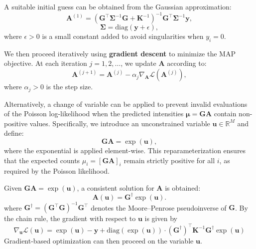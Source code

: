 \documentclass[12pt]{article}
\begin{document}
A suitable initial guess can be obtained from the Gaussian approximation:
\begin{equation}
    \mathbf{A}^{(1)} = \left( \mathbf{G}^\top \boldsymbol{\Sigma}^{-1} \mathbf{G} + \mathbf{K}^{-1} \right)^{-1} \mathbf{G}^\top \boldsymbol{\Sigma}^{-1} \mathbf{y},
\end{equation}
\begin{equation}
    \boldsymbol{\Sigma} = \mathrm{diag}(\mathbf{y} + \epsilon),
\end{equation}
where \( \epsilon > 0 \) is a small constant added to avoid singularities when \( y_i = 0 \).

We then proceed iteratively using \textbf{gradient descent} to minimize the MAP objective.
At each iteration \( j = 1, 2, \ldots \), we update \( \mathbf{A} \) according to:
\begin{equation}
    \mathbf{A}^{(j+1)} = \mathbf{A}^{(j)} - \alpha_j \nabla_{\mathbf{A}} \mathcal{L}(\mathbf{A}^{(j)}),
\end{equation}
where \( \alpha_j > 0 \) is the step size.

Alternatively, a change of variable can be applied to prevent invalid evaluations of the Poisson log-likelihood when the predicted intensities \( \boldsymbol{\mu} = \mathbf{G} \mathbf{A} \) contain non-positive values. Specifically, we introduce an unconstrained variable \( \mathbf{u} \in \mathbb{R}^M \) and define:
\begin{equation}
    \mathbf{G} \mathbf{A} = \exp(\mathbf{u}),
\end{equation}
where the exponential is applied element-wise. This reparameterization ensures that the expected counts \( \mu_i = [\mathbf{G} \mathbf{A}]_i \) remain strictly positive for all \( i \), as required by the Poisson likelihood.

Given \( \mathbf{G} \mathbf{A} = \exp(\mathbf{u}) \), a consistent solution for \( \mathbf{A} \) is obtained:
\begin{equation}
    \mathbf{A}(\mathbf{u}) = \mathbf{G}^\dagger \exp(\mathbf{u}).
\end{equation}
where \( \mathbf{G}^\dagger = \left( \mathbf{G}^\top \mathbf{G} \right)^{-1} \mathbf{G}^\top \) denotes the Moore--Penrose pseudoinverse of \( \mathbf{G} \).
By the chain rule, the gradient with respect to \( \mathbf{u} \) is given by
\begin{equation}
\nabla_{\mathbf{u}} \mathcal{L}(\mathbf{u}) =
\exp(\mathbf{u}) - \mathbf{y}
+ \mathrm{diag}(\exp(\mathbf{u})) \cdot (\mathbf{G}^\dagger)^\top \mathbf{K}^{-1} \mathbf{G}^\dagger \exp(\mathbf{u})
\end{equation}
Gradient-based optimization can then proceed on the variable \( \mathbf{u} \).
\end{document}
